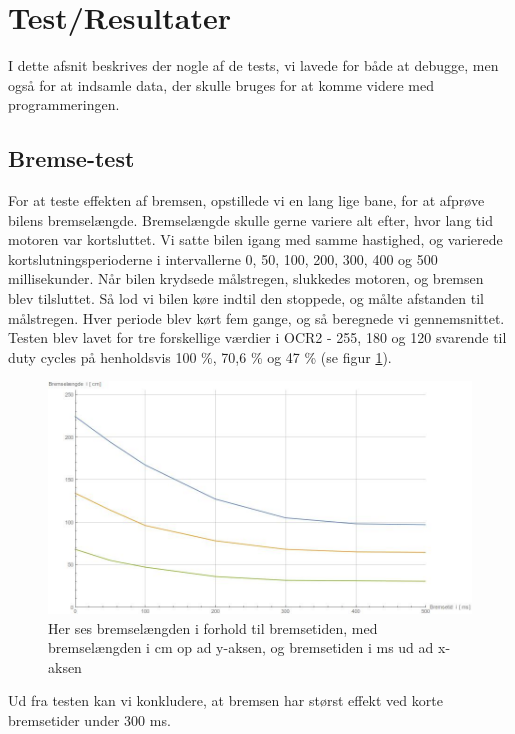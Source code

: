 \section{Test/Resultater}

I dette afsnit beskrives der nogle af de tests, vi lavede for både at debugge, men også for at indsamle data, der skulle bruges for at komme videre med programmeringen.

\subsection{Bremse-test}

For at teste effekten af bremsen, opstillede vi en lang lige bane, for at afprøve bilens bremselængde. Bremselængde skulle gerne variere alt efter, hvor lang tid motoren var kortsluttet. Vi satte bilen igang med samme hastighed, og varierede kortslutningsperioderne i intervallerne 0, 50, 100, 200, 300, 400 og 500 millisekunder. Når bilen krydsede målstregen, slukkedes motoren, og bremsen blev tilsluttet. Så lod vi bilen køre indtil den stoppede, og målte afstanden til målstregen. Hver periode blev kørt fem gange, og så beregnede vi gennemsnittet. Testen blev lavet for tre forskellige værdier i OCR2 - 255, 180 og 120 svarende til duty cycles på henholdsvis 100 \%, 70,6 \% og 47 \% (se figur \ref{fig:Bremselir}). 

\begin{figure}[h]

	\centering
		\includegraphics[scale=0.4]{Billeder/Bremse.jpeg}
	\caption{Her ses bremselængden i forhold til bremsetiden, med bremselængden i cm op ad y-aksen, og bremsetiden i ms ud ad x-aksen}
	\label{fig:Bremselir}
	
\end{figure}

Ud fra testen kan vi konkludere, at bremsen har størst effekt ved korte bremsetider under 300 ms.

